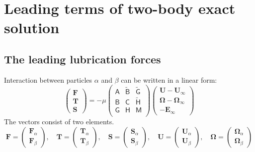 \documentclass[12pt]{article}
\newcommand{\tens}[1]{\bm{\mathsf{#1}}}
\begin{document}
\section{Leading terms of two-body exact solution}

\subsection*{The leading lubrication forces}


Interaction between particles $\alpha$ and $\beta$
can be written in a linear form:
\begin{equation}
 \begin{pmatrix}
  \bm{F} \\ \bm{T} \\ \bm{S}
 \end{pmatrix}
 =
- \mu
\begin{pmatrix}
 \tens{A} &  \tilde{\tens{B}} &  \tilde{\tens{G}} \\
 \tens{B} &  \tens{C} &  \tilde{\tens{H}} \\
 \tens{G} &  \tens{H} &  \tens{M} \\
\end{pmatrix}
 \begin{pmatrix}
  \bm{U}-\bm{U}_{\infty} \\ \bm{\Omega} - \bm{\Omega}_{\infty}
 \\ -\bm{E}_{\infty}
 \end{pmatrix}
\end{equation}
The vectors consist of two elements.
\begin{equation}
 \bm{F}
= 
\begin{pmatrix}
 \bm{F}_\alpha \\  \bm{F}_\beta
\end{pmatrix}
,\quad
 \bm{T}
= 
\begin{pmatrix}
 \bm{T}_\alpha \\  \bm{T}_\beta
\end{pmatrix}
,\quad
 \bm{S}
= 
\begin{pmatrix}
 \bm{S}_\alpha \\  \bm{S}_\beta
\end{pmatrix}
,\quad
 \bm{U}
= 
\begin{pmatrix}
 \bm{U}_\alpha \\  \bm{U}_\beta
\end{pmatrix}
,\quad
 \bm{\Omega}
= 
\begin{pmatrix}
 \bm{\Omega}_\alpha \\  \bm{\Omega}_\beta
\end{pmatrix}
\end{equation}
\end{document}
